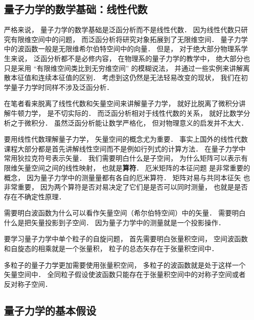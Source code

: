 
\begin{issues}
\issueDraft
\end{issues}

\subsection{量子力学的数学基础：线性代数}
严格来说， 量子力学的数学基础是泛函分析而不是线性代数． 因为线性代数只研究有限维空间中的问题， 而泛函分析将研究对象拓展到了无限维空间． 量子力学中的波函数一般是无限维希尔伯特空间中的向量． 但是， 对于绝大部分物理系学生来说， 泛函分析都不是必修内容， 在物理系的量子力学的教学中， 绝大部分也只是采用 “有限维空间类比到无穷维空间” 的模糊说法， 并通过一些实例来讲解离散本征值和连续本征值的区别． 考虑到这仍然是无法轻易改变的现状， 我们在初学量子力学时同样不涉及泛函分析．

在笔者看来脱离了线性代数和矢量空间来讲解量子力学， 就好比脱离了微积分讲解牛顿力学， 是不切实际的． 而泛函分析相对于线性代数的关系， 就好比数学分析之于微积分． 虽然泛函分析能让数学严格化， 但对物理意义的启发并不太大．

要用线性代数理解量子力学， 矢量空间的概念尤为重要． 事实上国外的线性代数课程大部分都是首先讲解线性空间而不是例如行列式的计算方法． 在量子力学中常用狄拉克符号表示矢量． 我们需要明白什么是子空间， 为什么矩阵可以表示有限维矢量空间之间的线性映射， 也就是\textbf{算符}． 厄米矩阵的本征问题 是非常重要的概念， 因为量子力学中的测量量都有各自的厄米算符． 矩阵对易与共同本征矢 也非常重要， 因为两个算符是否对易决定了它们是是否可以同时测量， 也就是是否存在不确定性原理．

需要明白波函数为什么可以看作矢量空间（希尔伯特空间）中的矢量． 需要明白什么是把矢量投影到子空间． 因为量子力学中的测量就是一个投影操作．

要学习量子力学中单个粒子的自旋问题， 首先需要明白张量积空间， 空间波函数和自旋态的相乘就是一个张量积， 粒子的总态矢存在于张量积空间中．

多粒子的量子力学更加需要使用张量积空间， 多粒子的波函数就是处于这样一个矢量空间中． 全同粒子假设使波函数只能存在于张量积空间中的对称子空间或者反对称子空间．

\subsection{量子力学的基本假设}

